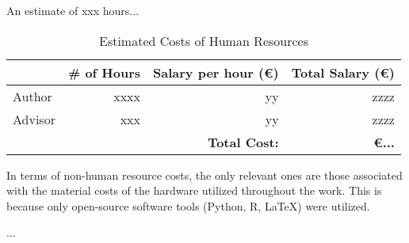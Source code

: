\documentclass[../main.tex]{subfiles}
\begin{document}
An estimate of xxx hours...

\begin{table}[H]
    \centering
    \caption{Estimated Costs of Human Resources}
    \label{tab:budget-human_resources}
    \begin{tabular}{lrrr}
    \toprule
    {} &  \# of Hours &  Salary per hour (€) &  Total Salary (€) \\
    \midrule
    Author  &                   xxxx &                    yy &        zzzz \\
    Advisor &                     xxx &                    yy &         zzzz \\
    \bottomrule
    {} &  {} & \textbf{Total Cost:} & \textbf{€...}
    \end{tabular}
\end{table}
\vspace*{-0.4cm}

In terms of non-human resource costs, the only relevant ones are those associated with the material costs of the hardware utilized throughout the work. This is because only open-source software tools (Python, R, LaTeX) were utilized.

...



\end{document}
